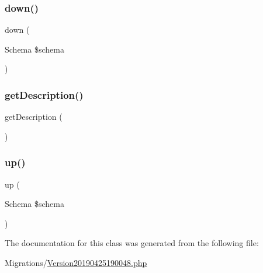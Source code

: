 \subsubsection{\texorpdfstring{down()}{down()}}
{\footnotesize\ttfamily down (\begin{DoxyParamCaption}\item[{Schema}]{\$schema }\end{DoxyParamCaption})}

\mbox{\label{class_doctrine_migrations_1_1_version20190425190048_a2e7bb35c71bf1824456ceb944cb7a845}} 
\subsubsection{\texorpdfstring{getDescription()}{getDescription()}}
{\footnotesize\ttfamily get\+Description (\begin{DoxyParamCaption}{ }\end{DoxyParamCaption})}

\mbox{\label{class_doctrine_migrations_1_1_version20190425190048_a23eb1c1428e8ea2ab2cf798fc06ec421}} 
\subsubsection{\texorpdfstring{up()}{up()}}
{\footnotesize\ttfamily up (\begin{DoxyParamCaption}\item[{Schema}]{\$schema }\end{DoxyParamCaption})}



The documentation for this class was generated from the following file\+:\begin{DoxyCompactItemize}
\item 
Migrations/\mbox{\hyperlink{_version20190425190048_8php}{Version20190425190048.\+php}}\end{DoxyCompactItemize}
